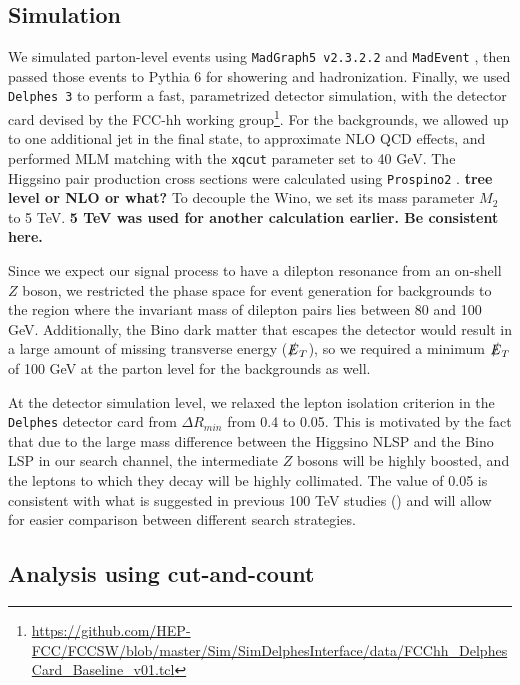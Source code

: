 \documentclass[a4paper,11pt]{article}
\newcommand{\Shufang}[1]{{\bf\color{Maroon}  #1}}
\newcommand{\met}{{\slashed{E}_T}}
\begin{document}
\subsection{Simulation}\label{simulation}

We simulated parton-level events using \texttt{MadGraph5 v2.3.2.2} and
\texttt{MadEvent} \citep{Alwall:2014hca}, then passed those events to Pythia 6
\citep{Sjostrand:2006za} for showering and hadronization. Finally, we used
\texttt{Delphes 3} \citep{deFavereau:2013fsa} to perform a fast, parametrized
detector simulation, with the detector card devised by the FCC-hh working
group\footnote{\url{https://github.com/HEP-FCC/FCCSW/blob/master/Sim/SimDelphesInterface/data/FCChh_DelphesCard_Baseline_v01.tcl}}.
For the backgrounds, we allowed up to one additional jet in the final state, to
approximate NLO QCD effects, and performed MLM matching with the \texttt{xqcut}
parameter set to 40 GeV. The Higgsino pair production cross sections were
calculated using \texttt{Prospino2} \citep{Beenakker:1999xh}. \Shufang{tree level or NLO or what?}  To decouple the
Wino, we set its mass parameter $M_2$ to 5 TeV. \Shufang{5 TeV was used for
another calculation earlier. Be consistent here.}

Since we expect our signal process to have a dilepton resonance from an on-shell
$Z$ boson, we restricted the phase space for event generation for backgrounds to
the region where the invariant mass of dilepton pairs lies between 80 and 100
GeV. Additionally, the Bino dark matter that escapes the detector would result
in a large amount of missing transverse energy ($\met$), so we required
a minimum $\met$ of 100 GeV at the parton level for the backgrounds as
well. 

At the detector simulation level, we relaxed the lepton isolation criterion in the
\texttt{Delphes} detector card from $\Delta R_{min}$ from 0.4 to 0.05. This is
motivated by the fact that due to the large mass difference between the Higgsino
NLSP and the Bino LSP in our search channel, the intermediate $Z$ bosons will be
highly boosted, and the leptons to which they decay will be highly collimated.
The value of 0.05 is consistent with what is suggested in previous 100 TeV
studies (\citep{Acharya:2014pua,Gori:2014oua,Bramante:2014tba}) and will allow
for easier comparison between different search strategies.


\subsection{Analysis using cut-and-count}
\label{event-selection}
\end{document}
